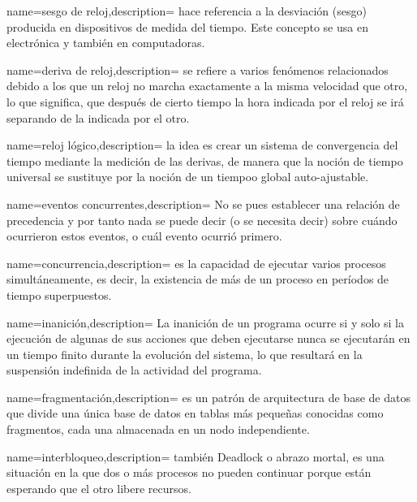 {name={sesgo de reloj},description= {hace referencia a la desviación (sesgo) producida en dispositivos de medida del tiempo. Este concepto se usa en electrónica y también en computadoras.}}

{name={deriva de reloj},description= {se refiere a varios fenómenos relacionados debido a los que un reloj no marcha exactamente a la misma velocidad que otro, lo que significa, que después de cierto tiempo la hora indicada por el reloj se irá separando de la indicada por el otro.}}

{name={reloj  lógico},description= {la idea es crear un sistema de convergencia del tiempo mediante la medición de las derivas, de manera que la noción de tiempo universal se sustituye por la noción de un tiempoo global auto-ajustable.}}

{name={eventos concurrentes},description= {No se pues establecer una relaci\'on de precedencia y por tanto  nada se puede decir (o se necesita decir) sobre cuándo ocurrieron estos eventos, o cuál evento ocurrió primero.}}

{name={concurrencia},description= { es la capacidad de ejecutar varios procesos simultáneamente, es decir, la existencia de más de un proceso en  períodos de tiempo superpuestos.}}

  {name={inanición},description= {La inanición de un programa ocurre si y solo si la ejecución de algunas de sus acciones que deben ejecutarse nunca se ejecutarán en un tiempo finito durante la evolución del sistema, lo que resultará en la suspensión indefinida de la actividad del programa.}}
  
  {name={fragmentación},description= {es un patrón de arquitectura de base de datos   que divide una única base de datos en tablas más pequeñas conocidas como fragmentos, cada una almacenada en un nodo independiente.}}
 
 {name={interbloqueo},description= {tambi\'en Deadlock o abrazo mortal, es una situación en la que dos o más procesos no pueden continuar porque están esperando que el otro libere recursos.}}



